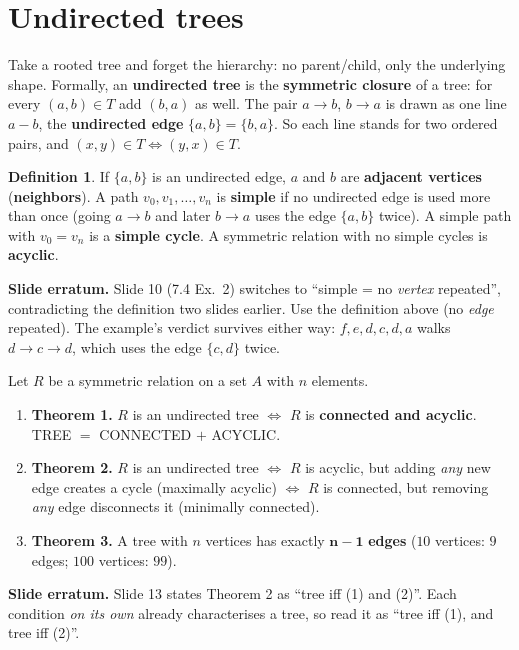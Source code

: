 \documentclass{fkt-notes}
\newcommand{\erratum}[1]{\par\noindent\textbf{Slide erratum.} #1\par}
\newcommand{\src}[1]{\par\noindent{\small\itshape Source: #1}\par\smallskip}
\newcommand{\kolman}[1]{\setcounter{section}{\numexpr#1-1\relax}}
\theoremstyle{definition}
\newtheorem*{defn}{Definition}
\begin{document}
\kolman{4}
\section{Undirected trees}\src{Kolman 7.4}
%

Take a rooted tree and forget the hierarchy: no parent/child, only the
underlying shape. Formally, an \textbf{undirected tree} is the
\textbf{symmetric closure} of a tree: for every $(a,b)\in T$ add $(b,a)$
as well. The pair $a\to b$, $b\to a$ is drawn as one line $a - b$, the
\textbf{undirected edge} $\{a,b\}=\{b,a\}$. So each line stands for two
ordered pairs, and $(x,y)\in T\iff(y,x)\in T$.

\begin{defn}
  If $\{a,b\}$ is an undirected edge, $a$ and $b$ are \textbf{adjacent
    vertices} (\textbf{neighbors}). A path $v_0,v_1,\dots,v_n$ is
  \textbf{simple} if no undirected edge is used more than once (going
  $a\to b$ and later $b\to a$ uses the edge $\{a,b\}$ twice). A simple
  path with $v_0=v_n$ is a \textbf{simple cycle}. A symmetric relation
  with no simple cycles is \textbf{acyclic}.
\end{defn}
\erratum{Slide 10 (7.4 Ex.~2) switches to ``simple = no \emph{vertex}
  repeated'', contradicting the definition two slides earlier. Use the
  definition above (no \emph{edge} repeated). The example's verdict
  survives either way: $f,e,d,c,d,a$ walks $d\to c\to d$, which uses the
  edge $\{c,d\}$ twice.}

\begin{rulebox}[title={7.4 Theorems 1--3: what makes an undirected tree}]
  Let $R$ be a symmetric relation on a set $A$ with $n$ elements.
  \begin{enumerate}[nosep,label=(\arabic*)]
    \item \textbf{Theorem 1.} $R$ is an undirected tree $\iff$ $R$ is
          \textbf{connected and acyclic}. \quad TREE $=$ CONNECTED $+$
          ACYCLIC.
    \item \textbf{Theorem 2.} $R$ is an undirected tree $\iff$ $R$ is
          acyclic, but adding \emph{any} new edge creates a cycle
          (maximally acyclic) $\iff$ $R$ is connected, but removing
          \emph{any} edge disconnects it (minimally connected).
    \item \textbf{Theorem 3.} A tree with $n$ vertices has exactly
          $\mathbf{n-1}$ \textbf{edges} ($10$ vertices: $9$ edges; $100$
          vertices: $99$).
  \end{enumerate}
\end{rulebox}
\erratum{Slide 13 states Theorem 2 as ``tree iff (1) and (2)''. Each
  condition \emph{on its own} already characterises a tree, so read it as
  ``tree iff (1), and tree iff (2)''.}
\end{document}
